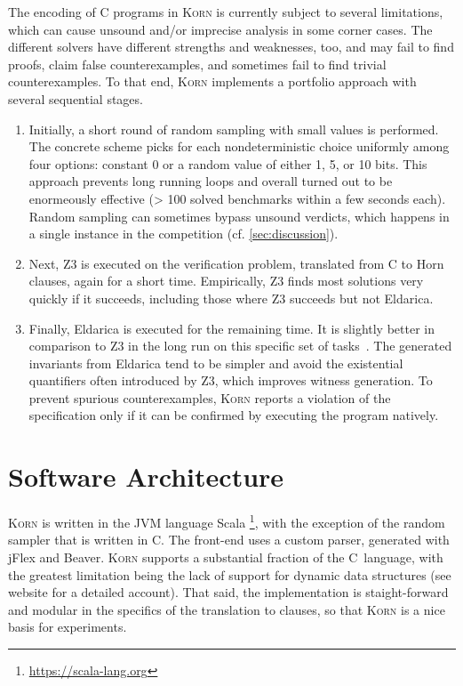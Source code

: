 \documentclass{llncs}
\newcommand{\Korn}{\textsc{Korn}\xspace}
\begin{document}
The encoding of C programs in \Korn is currently subject to several limitations,
which can cause unsound and/or imprecise analysis in some corner cases.
The different solvers have different strengths and weaknesses, too,
and may fail to find proofs, claim false counterexamples, and sometimes fail to find trivial counterexamples.
To that end, \Korn implements a portfolio approach with several sequential stages.
\begin{enumerate}
    \item Initially, a short round of random sampling with small values is performed.
          The concrete scheme picks for each nondeterministic choice
          uniformly among four options: constant 0 or a random value of either 1, 5, or 10 bits.
          This approach prevents long running loops and overall turned out to be enormeously effective
          (> 100 solved benchmarks within a few seconds each).
          Random sampling can sometimes bypass unsound verdicts,
          which happens in a single instance in the competition (cf. \cref{sec:discussion}).
    \item Next, Z3 is executed on the verification problem, translated from C to Horn clauses,
          again for a short time. Empirically, Z3 finds most solutions very quickly if it succeeds,
          including those where Z3 succeeds but not Eldarica.
    \item Finally, Eldarica is executed for the remaining time.
          It is slightly better in comparison to Z3 in the long run on this specific set of tasks~\cite{ernst:arxiv2020:summaries}.
    The generated invariants from Eldarica tend to be simpler and avoid the existential quantifiers
    often introduced by Z3, which improves witness generation.
    To prevent spurious counterexamples,
    \Korn reports a violation of the specification only if it can be confirmed by executing the program natively.
\end{enumerate}


\section{Software Architecture}
\label{sec:architecture}

\Korn is written in the JVM language Scala%
    \footnote{\url{https://scala-lang.org}}, with the exception of the random sampler that is written in C.
The front-end uses a custom parser, generated with jFlex and Beaver.
\Korn supports a substantial fraction of the C~language, with the greatest limitation
being the lack of support for dynamic data structures (see website for a detailed account).
That said, the implementation is staight-forward and modular in the specifics of the translation
to clauses, so that \Korn is a nice basis for experiments.
\end{document}
